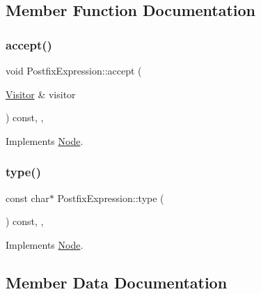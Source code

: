 \subsection{Member Function Documentation}
\mbox{\label{struct_postfix_expression_a2d814c990b7d1fb728f030a2673fe729}} 
\subsubsection{\texorpdfstring{accept()}{accept()}}
{\footnotesize\ttfamily void Postfix\+Expression\+::accept (\begin{DoxyParamCaption}\item[{\hyperlink{struct_visitor}{Visitor} \&}]{visitor }\end{DoxyParamCaption}) const\hspace{0.3cm}{\ttfamily [inline]}, {\ttfamily [override]}, {\ttfamily [virtual]}}



Implements \hyperlink{struct_node_a10bd7af968140bbf5fa461298a969c71}{Node}.

\mbox{\label{struct_postfix_expression_a9971fc9b1733fa57b257a916102696fd}} 
\subsubsection{\texorpdfstring{type()}{type()}}
{\footnotesize\ttfamily const char$\ast$ Postfix\+Expression\+::type (\begin{DoxyParamCaption}{ }\end{DoxyParamCaption}) const\hspace{0.3cm}{\ttfamily [inline]}, {\ttfamily [override]}, {\ttfamily [virtual]}}



Implements \hyperlink{struct_node_a82f29420d0a38efcc370352528e94e9b}{Node}.



\subsection{Member Data Documentation}
\mbox{\label{struct_postfix_expression_a33a5946e6ded6300ea8552325f22cba9}} 

